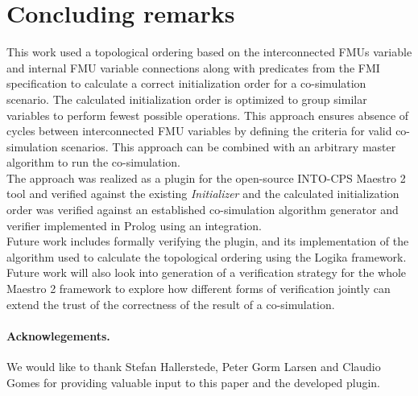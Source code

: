 \section{Concluding remarks}\label{sc:summary}
This work used a topological ordering based on the interconnected FMUs variable and internal FMU variable connections along with predicates from the FMI specification to calculate a correct initialization order for a co-simulation scenario. The calculated initialization order is optimized to group similar variables to perform fewest possible operations.
This approach ensures absence of cycles between interconnected FMU variables by defining the criteria for valid co-simulation scenarios.
This approach can be combined with an arbitrary master algorithm to run the co-simulation. \\
The approach was realized as a plugin for the open-source INTO-CPS Maestro 2 tool and verified against the existing \textit{Initializer} and the calculated initialization order was verified against an established co-simulation algorithm generator and verifier implemented in Prolog using an integration.\\
Future work includes formally verifying the plugin, and its implementation of the algorithm used to calculate the topological ordering using the Logika framework.
Future work will also look into generation of a verification strategy for the whole Maestro 2 framework to explore how different forms of verification jointly can extend the trust of the correctness of the result of a co-simulation. 

\paragraph*{\textbf{Acknowlegements.}}We would like to thank Stefan Hallerstede, Peter Gorm Larsen and Claudio Gomes for providing valuable input to this paper and the developed plugin.